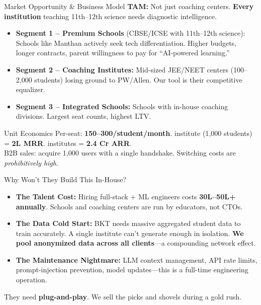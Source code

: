 \documentclass[aspectratio=169, 10pt]{beamer}
\newcommand{\bspace}{\vspace{0.3em}}
\begin{document}
\begin{frame}{Market Opportunity \& Business Model}
  \small
  \textbf{TAM:} Not just coaching centers. \textbf{Every institution} teaching 11th--12th science needs diagnostic intelligence.

  \bspace
  \begin{itemize}
    \setlength\itemsep{0.4em}
    \item \textbf{Segment 1 -- Premium Schools} (CBSE/ICSE with 11th--12th science): Schools like Manthan actively seek tech differentiation. Higher budgets, longer contracts, parent willingness to pay for ``AI-powered learning.''

    \item \textbf{Segment 2 -- Coaching Institutes:} Mid-sized JEE/NEET centers (100--2{,}000 students) losing ground to PW/Allen. Our tool is their competitive equalizer.

    \item \textbf{Segment 3 -- Integrated Schools:} Schools with in-house coaching divisions. Largest seat counts, highest LTV.
  \end{itemize}

  \vspace{0.3em}
  \begin{block}{Unit Economics}
    \centering
    \small Per-seat: \textbf{150--300/student/month}.  institute (1{,}000 students) = \textbf{2L MRR}.  institutes = \textbf{2.4 Cr ARR}.\\[0.2em]
    B2B sales: acquire 1{,}000 users with a single handshake. Switching costs are \emph{prohibitively high}.
  \end{block}
\end{frame}

\begin{frame}{Why Won't They Build This In-House?}
  \small
  \begin{itemize}
    \setlength\itemsep{0.5em}
    \item \textbf{The Talent Cost:} Hiring full-stack + ML engineers costs \textbf{30L--50L+ annually}. Schools and coaching centers are run by educators, not CTOs.

    \item \textbf{The Data Cold Start:} BKT needs massive aggregated student data to train accurately. A single institute can't generate enough in isolation. \textbf{We pool anonymized data across all clients}---a compounding network effect.

    \item \textbf{The Maintenance Nightmare:} LLM context management, API rate limits, prompt-injection prevention, model updates---this is a full-time engineering operation.
  \end{itemize}

  \vspace{0.5em}
  \begin{block}{}
    \centering
    They need \textbf{plug-and-play}. We sell the picks and shovels during a gold rush.
  \end{block}
\end{frame}
\end{document}
